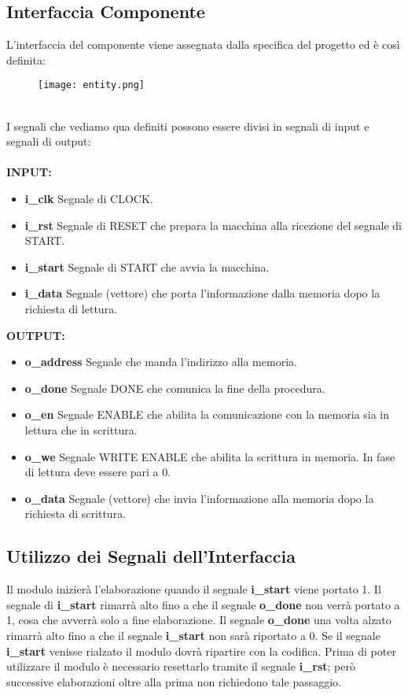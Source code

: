 \documentclass[a4paper]{article}
\begin{document}
\subsection{Interfaccia Componente}
L'interfaccia del componente viene assegnata dalla specifica del progetto ed è così definita:
\begin{figure}[htp]
    \centering
    \texttt{[image: entity.png]}
    \label{fig:interface}
\end{figure}
\\I segnali che vediamo qua definiti possono essere divisi in segnali di input e segnali di output:\\\\
\textbf{INPUT:}
\begin{itemize}
\item \textbf{i\_clk} Segnale di CLOCK.
\item \textbf{i\_rst} Segnale di RESET che prepara la macchina alla ricezione del segnale di START.
\item \textbf{i\_start} Segnale di START che avvia la macchina.
\item \textbf{i\_data} Segnale (vettore) che porta l'informazione dalla memoria dopo la richiesta di lettura.
\end{itemize}
\textbf{OUTPUT:}
\begin{itemize}
\item \textbf{o\_address} Segnale che manda l'indirizzo alla memoria.
\item \textbf{o\_done} Segnale DONE che comunica la fine della procedura.
\item \textbf{o\_en} Segnale ENABLE che abilita la comunicazione con la memoria sia in lettura che in scrittura.
\item \textbf{o\_we} Segnale WRITE ENABLE che abilita la scrittura in memoria. In fase di lettura deve essere pari a 0.
\item \textbf{o\_data} Segnale (vettore) che invia l'informazione alla memoria dopo la richiesta di scrittura.
\end{itemize}
\subsection{Utilizzo dei Segnali dell'Interfaccia}
Il modulo inizierà l'elaborazione quando il segnale \textbf{i\_start} viene portato 1. Il segnale di \textbf{i\_start} rimarrà alto fino a che il segnale \textbf{o\_done} non verrà portato a 1, cosa che avverrà solo a fine elaborazione. Il segnale \textbf{o\_done} una volta alzato rimarrà alto fino a che il segnale \textbf{i\_start} non sarà riportato a 0. Se il segnale \textbf{i\_start} venisse rialzato il modulo dovrà ripartire con la codifica. 
Prima di poter utilizzare il modulo è necessario resettarlo tramite il segnale \textbf{i\_rst}; però successive elaborazioni oltre alla prima non richiedono tale passaggio.
\end{document}
